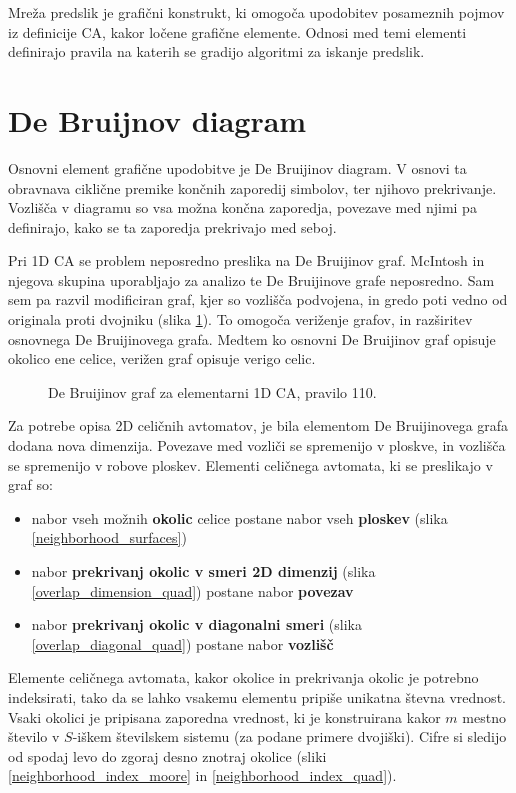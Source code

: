 \documentclass[12pt,a4paper,openany,twoside]{book}
\begin{document}
Mreža predslik je grafični konstrukt, ki omogoča upodobitev posameznih pojmov
iz definicije CA, kakor ločene grafične elemente. Odnosi med
temi elementi definirajo pravila na katerih se gradijo algoritmi za iskanje
predslik.

\section{De Bruijnov diagram}

Osnovni element grafične upodobitve je De Bruijinov diagram. V osnovi ta obravnava
ciklične premike končnih zaporedij simbolov, ter njihovo prekrivanje. Vozlišča v
diagramu so vsa možna končna zaporedja, povezave med njimi pa definirajo, kako se
ta zaporedja prekrivajo med seboj.

Pri 1D CA se problem neposredno preslika na De Bruijinov graf. McIntosh
in njegova skupina uporabljajo za analizo te De Bruijinove grafe neposredno. Sam sem pa
razvil modificiran graf, kjer so vozlišča podvojena, in gredo poti vedno od originala
proti dvojniku (slika \ref{de_bruijn_diagram}).
To omogoča veriženje grafov, in razširitev osnovnega De Bruijinovega grafa.
Medtem ko osnovni De Bruijinov graf opisuje okolico ene celice, verižen graf opisuje verigo celic.

\begin{figure}[htb]
\centerline{}
\caption[De Bruijinov graf, pravilo 110.]{De Bruijinov graf za elementarni 1D CA, pravilo 110.}
\label{de_bruijn_diagram}
\end{figure}

Za potrebe opisa 2D celičnih avtomatov, je bila elementom
De Bruijinovega grafa dodana nova dimenzija. Povezave med vozliči se spremenijo
v ploskve, in vozlišča se spremenijo v robove ploskev.
Elementi celičnega avtomata, ki se preslikajo v graf so:
\begin{itemize}[noitemsep,nolistsep]
\item nabor vseh možnih \textbf{okolic} celice postane nabor vseh \textbf{ploskev} (slika \ref{neighborhood_surfaces})
\item nabor \textbf{prekrivanj okolic v smeri 2D dimenzij} (slika \ref{overlap_dimension_quad}) postane nabor \textbf{povezav}
\item nabor \textbf{prekrivanj okolic v diagonalni smeri} (slika \ref{overlap_diagonal_quad}) postane nabor \textbf{vozlišč}
\end{itemize}

Elemente celičnega avtomata, kakor okolice in prekrivanja okolic je potrebno indeksirati,
tako da se lahko vsakemu elementu pripiše unikatna števna vrednost.
Vsaki okolici je pripisana zaporedna vrednost, ki je konstruirana kakor \(m\) mestno število
v \(S\)-iškem številskem sistemu (za podane primere dvojiški).
Cifre si sledijo od spodaj levo do zgoraj desno znotraj okolice
(sliki \ref{neighborhood_index_moore} in \ref{neighborhood_index_quad}).
\end{document}
